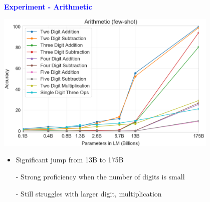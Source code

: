 \documentclass[professionalfont]{beamer}
\begin{document}
\begin{frame}

\begin{center}
    { \textbf{\textcolor{blue}{ {\fontsize{12}{14}\selectfont Experiment - Arithmetic} }} }
\end{center}

\begin{center}
    \includegraphics[width=0.8\textwidth]{figure/3-10.png}
\end{center}

{\fontsize{10}{14}\selectfont 
\begin{itemize}
    \item Significant jump from 13B to 175B

    - Strong proficiency when the number of digits is small

    - Still struggles with larger digit, multiplication

\end{itemize}
}

\end{frame}
\end{document}
